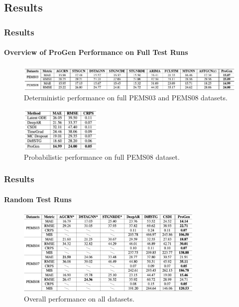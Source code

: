 \documentclass[light]{lutbeamer} %
\begin{document}
\subsection{Results}
\begin{frame}
    \frametitle{Results}
    \framesubtitle{Overview of ProGen Performance on Full Test Runs}

    \begin{figure}[ht]
        \centering
        \includegraphics[width=\textwidth]{figures/det_full_tab.png}
        \caption{Deterministic performance on full PEMS03 and PEMS08 datasets.}
    \end{figure}

    \begin{figure}[htbp]
        \centering
        \includegraphics[width=0.35\textwidth]{figures/prob_full_tab.png}
        \caption{Probabilistic performance on full PEMS08 dataset.}
    \end{figure}
\end{frame}

\begin{frame}
    \frametitle{Results}
    \framesubtitle{Random Test Runs}

    \begin{figure}[ht]
        \centering
        \includegraphics[width=0.8\textwidth]{figures/random_runs_tab.png}
        \caption{Overall performance on all datasets.}
    \end{figure}
\end{frame}
\end{document}

